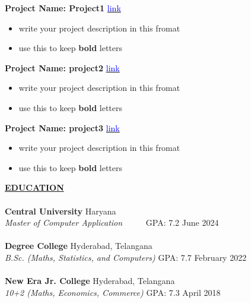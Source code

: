 \documentclass{article}
\begin{document}
\noindent \textbf{Project Name: Project1} \hfill \href{https://github.com/rahulpinto19/Vconnect}{\textcolor{blue}{link}} 
\begin{itemize}[noitemsep,nolistsep,leftmargin=*]
 \item write your project description in this fromat  
    \item use this to  keep \textbf{bold} letters
   \\
   
\end{itemize}

\noindent \textbf{Project Name: project2} \hfill \href{https://github.com/rahulpinto19/NewsApp}{\textcolor{blue}{link}}
\begin{itemize}[noitemsep,nolistsep,leftmargin=*]
 \item write your project description in this fromat  
    \item use this to  keep \textbf{bold} letters
   \\
   
\end{itemize}

\noindent \textbf{Project Name: project3} \hfill \href{https://https://github.com/rahulpinto19/MachineLearning/tree/master/Breast%20Cancer%20Prediction/}{\textcolor{blue}{link}}
\begin{itemize}[noitemsep,nolistsep,leftmargin=*]
\item write your project description in this fromat  
    \item use this to  keep \textbf{bold} letters
   \\
   
\end{itemize}

\noindent \textbf{\underline{EDUCATION}} \\
{\\}
\textbf{Central University } \hfill  Haryana \\
\textit{Master of Computer Application} \hfill ~~~~~GPA: 7.2 \hfill June 2024 \\ \\
\textbf{Degree College} \hfill Hyderabad, Telangana \\
\textit{B.Sc. (Maths, Statistics, and Computers)} \hfill GPA: 7.7 \hfill February 2022 \\ \\
\textbf{New Era Jr. College} \hfill Hyderabad, Telangana \\
\textit{10+2 (Maths, Economics, Commerce)} \hfill GPA: 7.3 \hfill April 2018 \\
\end{document}
